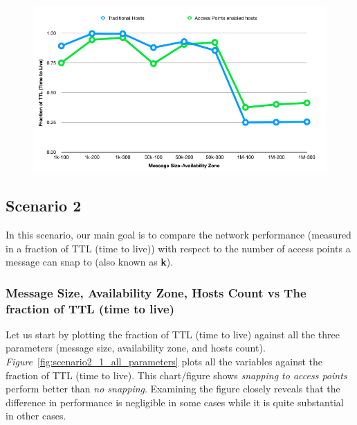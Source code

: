 {\begin{figure}[H]
  \label{fig:scenario1_message_size_availability_zone_1}
\end{figure}
\begin{figure}[H]
  \centering
  \includegraphics[scale=0.55]{./figures/scenario1_message_size_availability_zone_2}
  \label{fig:scenario1_message_size_availability_zone_2}
\end{figure}
\newpage
\subsection{Scenario 2}
In this scenario, our main goal is to compare the network performance (measured in a fraction of TTL (time to live)) with respect to the number of access points a message can snap to (also known as \textbf{k}).
\subsubsection{Message Size, Availability Zone, Hosts Count vs The fraction of TTL (time to live)}
Let us start by plotting the fraction of TTL (time to live) against all the three parameters (message size, availability zone, and  hosts count). \emph{Figure}~\ref{fig:scenario2_1_all_parameters} plots all the variables against the fraction of TTL (time to live). This chart/figure shows \textit{snapping to access points} perform better than \textit{no snapping}. Examining the figure closely reveals that the difference in performance is negligible in some cases while it is quite substantial in other cases.

}
